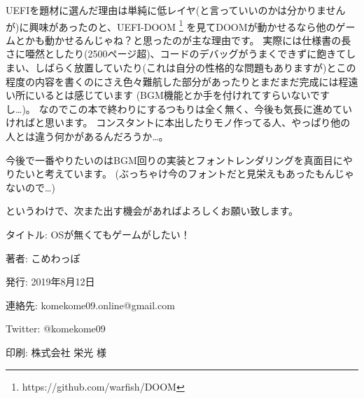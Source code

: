 \documentclass[10pt,b5paper,twoside,openany]{ltjsbook}
\begin{document}
UEFIを題材に選んだ理由は単純に低レイヤ(と言っていいのかは分かりませんが)に興味があったのと、UEFI-DOOM
\footnote{https://github.com/warfish/DOOM}
を見てDOOMが動かせるなら他のゲームとかも動かせるんじゃね？と思ったのが主な理由です。
実際には仕様書の長さに唖然としたり(2500ページ超)、コードのデバッグがうまくできずに飽きてしまい、しばらく放置していたり(これは自分の性格的な問題もありますが)とこの程度の内容を書くのにさえ色々難航した部分があったりとまだまだ完成には程遠い所にいるとは感じています
(BGM機能とか手を付けれてすらいないですし…)。
なのでこの本で終わりにするつもりは全く無く、今後も気長に進めていければと思います。
コンスタントに本出したりモノ作ってる人、やっぱり他の人とは違う何かがあるんだろうか…。

今後で一番やりたいのはBGM回りの実装とフォントレンダリングを真面目にやりたいと考えています。
(ぶっちゃけ今のフォントだと見栄えもあったもんじゃないので…)

というわけで、次また出す機会があればよろしくお願い致します。
\newpage

\thispagestyle{empty}
\printbibliography[title=参考文献]
\newpage

\thispagestyle{empty}
\begin{flushright}
    \begin{minipage}{0.8\hsize}
        \begin{description}
            \item{タイトル: } OSが無くてもゲームがしたい！
            \item{著者: }こめわっぽ
            \item{発行: }2019年8月12日
            \item{連絡先: }komekome09.online@gmail.com
            \item{Twitter: }@komekome09
            \item{印刷: }株式会社 栄光 様
        \end{description}
    \end{minipage}
\end{flushright}
\newpage

\end{document}
